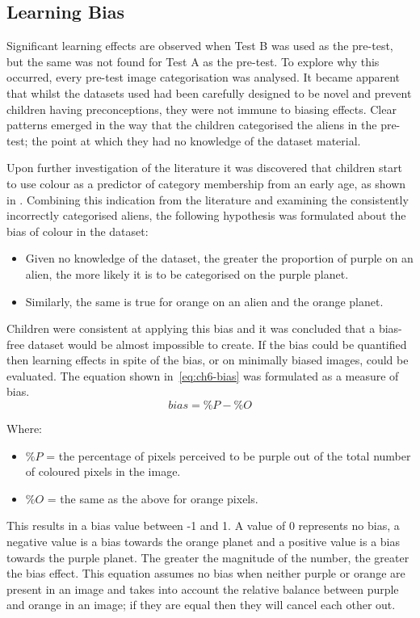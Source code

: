 \subsection{Learning Bias} \label{sec:ch6-biasing}
Significant learning effects are observed when Test B was used as the pre-test, but the same was not found for Test A as the pre-test. To explore why this occurred, every pre-test image categorisation was analysed. It became apparent that whilst the datasets used had been carefully designed to be novel and prevent children having preconceptions, they were not immune to biasing effects. Clear patterns emerged in the way that the children categorised the aliens in the pre-test; the point at which they had no knowledge of the dataset material. 

Upon further investigation of the literature it was discovered that children start to use colour as a predictor of category membership from an early age, as shown in \cite{macario1991young}. Combining this indication from the literature and examining the consistently incorrectly categorised aliens, the following hypothesis was formulated about the bias of colour in the dataset:
\begin{itemize}
	\item Given no knowledge of the dataset, the greater the proportion of purple on an alien, the more likely it is to be categorised on the purple planet.
	\item Similarly, the same is true for orange on an alien and the orange planet.
\end{itemize}

Children were consistent at applying this bias and it was concluded that a bias-free dataset would be almost impossible to create. If the bias could be quantified then learning effects in spite of the bias, or on minimally biased images, could be evaluated. The equation shown in~\ref{eq:ch6-bias} was formulated as a measure of bias.
\begin{equation}\label{eq:ch6-bias}
	bias = \%P - \%O
\end{equation}

Where:
\begin{itemize}
	\item $\%P$ = the percentage of pixels perceived to be purple out of the total number of coloured pixels in the image.
	\item $\%O$ = the same as the above for orange pixels.
\end{itemize}

This results in a bias value between -1 and 1. A value of 0 represents no bias, a negative value is a bias towards the orange planet and a positive value is a bias towards the purple planet. The greater the magnitude of the number, the greater the bias effect. This equation assumes no bias when neither purple or orange are present in an image and takes into account the relative balance between purple and orange in an image; if they are equal then they will cancel each other out.

